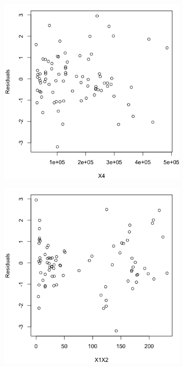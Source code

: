 \documentclass[10pt]{report}
\begin{document}
\begin{enumerate}
\begin{figure}[H]
\begin{subfigure}[b]{.25\linewidth}
		\end{subfigure}\\
		\begin{subfigure}[b]{.25\linewidth}
			\includegraphics[width=\linewidth]{p2/18e_x4.png}
		\end{subfigure}%
		\begin{subfigure}[b]{.25\linewidth}
			\includegraphics[width=\linewidth]{p2/18e_x1x2.png} 

\end{subfigure}
\end{figure}
\end{enumerate}
\end{document}
